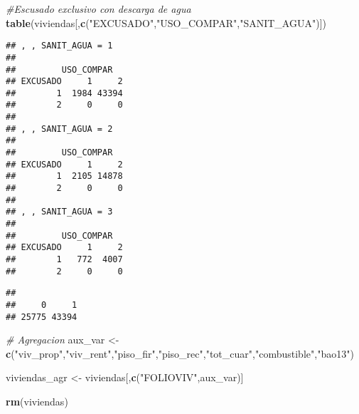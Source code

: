 \documentclass[11pt,]{article}
\newenvironment{Shaded}{\begin{snugshade}}{\end{snugshade}}
\newcommand{\KeywordTok}[1]{\textcolor[rgb]{0.13,0.29,0.53}{\textbf{#1}}}
\newcommand{\DecValTok}[1]{\textcolor[rgb]{0.00,0.00,0.81}{#1}}
\newcommand{\StringTok}[1]{\textcolor[rgb]{0.31,0.60,0.02}{#1}}
\newcommand{\CommentTok}[1]{\textcolor[rgb]{0.56,0.35,0.01}{\textit{#1}}}
\newcommand{\OperatorTok}[1]{\textcolor[rgb]{0.81,0.36,0.00}{\textbf{#1}}}
\newcommand{\NormalTok}[1]{#1}
\begin{document}
\begin{Shaded}
\begin{Highlighting}[]
\CommentTok{#Escusado exclusivo con descarga de agua}
\KeywordTok{table}\NormalTok{(viviendas[,}\KeywordTok{c}\NormalTok{(}\StringTok{"EXCUSADO"}\NormalTok{,}\StringTok{"USO_COMPAR"}\NormalTok{,}\StringTok{"SANIT_AGUA"}\NormalTok{)])}
\end{Highlighting}
\end{Shaded}

\begin{verbatim}
## , , SANIT_AGUA = 1
## 
##         USO_COMPAR
## EXCUSADO     1     2
##        1  1984 43394
##        2     0     0
## 
## , , SANIT_AGUA = 2
## 
##         USO_COMPAR
## EXCUSADO     1     2
##        1  2105 14878
##        2     0     0
## 
## , , SANIT_AGUA = 3
## 
##         USO_COMPAR
## EXCUSADO     1     2
##        1   772  4007
##        2     0     0
\end{verbatim}

\begin{Shaded}
\end{Shaded}

\begin{verbatim}
## 
##     0     1 
## 25775 43394
\end{verbatim}

\begin{Shaded}
\begin{Highlighting}[]
\CommentTok{# Agregacion}
\NormalTok{aux_var <-}\StringTok{ }\KeywordTok{c}\NormalTok{(}\StringTok{"viv_prop"}\NormalTok{,}\StringTok{"viv_rent"}\NormalTok{,}\StringTok{"piso_fir"}\NormalTok{,}\StringTok{"piso_rec"}\NormalTok{,}\StringTok{"tot_cuar"}\NormalTok{,}\StringTok{"combustible"}\NormalTok{,}\StringTok{"bao13"}\NormalTok{)}

\NormalTok{viviendas_agr <-}\StringTok{ }\NormalTok{viviendas[,}\KeywordTok{c}\NormalTok{(}\StringTok{"FOLIOVIV"}\NormalTok{,aux_var)]}
  
\KeywordTok{rm}\NormalTok{(viviendas)}
\end{Highlighting}
\end{Shaded}
\end{document}
